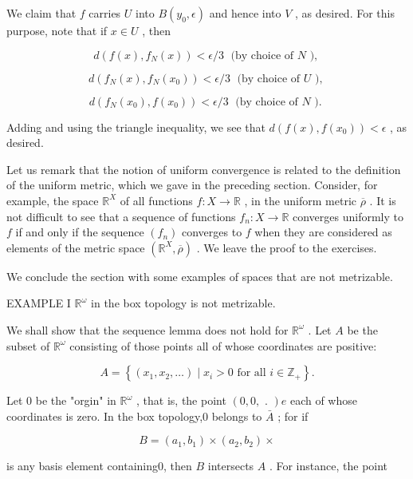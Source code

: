 \documentclass[10pt]{article}
\begin{document}
We claim that \(f\) carries \(U\) into \(B\left( {{y}_{0},\epsilon }\right)\) and hence into \(V\) , as desired. For this purpose, note that if \(x \in  U\) , then

\[
d\left( {f\left( x\right) ,{f}_{N}\left( x\right) }\right)  < \epsilon /3\;\text{ (by choice of }N\text{ ), }
\]

\[
d\left( {{f}_{N}\left( x\right) ,{f}_{N}\left( {x}_{0}\right) }\right)  < \epsilon /3\;\text{ (by choice of }U\text{ ), }
\]

\[
d\left( {{f}_{N}\left( {x}_{0}\right) ,f\left( {x}_{0}\right) }\right)  < \epsilon /3\;\text{ (by choice of }N\text{ ). }
\]

Adding and using the triangle inequality, we see that \(d\left( {f\left( x\right) ,f\left( {x}_{0}\right) }\right)  < \epsilon\) , as desired.

Let us remark that the notion of uniform convergence is related to the definition of the uniform metric, which we gave in the preceding section. Consider, for example, the space \({\mathbb{R}}^{X}\) of all functions \(f : X \rightarrow  \mathbb{R}\) , in the uniform metric \(\overline{\rho }\) . It is not difficult to see that a sequence of functions \({f}_{n} : X \rightarrow  \mathbb{R}\) converges uniformly to \(f\) if and only if the sequence \(\left( {f}_{n}\right)\) converges to \(f\) when they are considered as elements of the metric space \(\left( {{\mathbb{R}}^{X},\overline{\rho }}\right)\) . We leave the proof to the exercises.

We conclude the section with some examples of spaces that are not metrizable.

EXAMPLE I \({\mathbb{R}}^{\omega }\) in the box topology is not metrizable.

We shall show that the sequence lemma does not hold for \({\mathbb{R}}^{\omega }\) . Let \(A\) be the subset of \({\mathbb{R}}^{\omega }\) consisting of those points all of whose coordinates are positive:

\[
A = \left\{  {\left( {{x}_{1},{x}_{2},\ldots }\right)  \mid  {x}_{i} > 0\text{ for all }i \in  {\mathbb{Z}}_{ + }}\right\}  .
\]

Let 0 be the "orgin" in \({\mathbb{R}}^{\omega }\) , that is, the point \(\left( {0,0,\text{ . }}\right) e\) each of whose coordinates is zero. In the box topology,0 belongs to \(\bar{A}\) ; for if

\[
B = \left( {{a}_{1},{b}_{1}}\right)  \times  \left( {{a}_{2},{b}_{2}}\right)  \times
\]

is any basis element containing0, then \(B\) intersects \(A\) . For instance, the point
\end{document}
